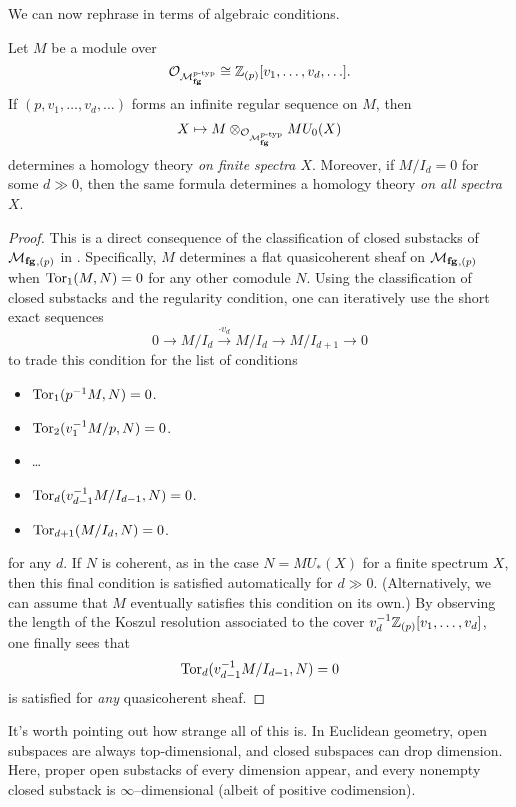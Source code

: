We can now rephrase  in terms of algebraic conditions.
\begin{theorem}
Let $M$ be a module over \[\mathcal{O}_{\mathcal{M}_{\mathbf{fg}}^{p\text{-}\mathrm{typ}}} \cong \mathbb Z_{(p)}[v_1, \ldots, v_d, \ldots].\]  If $(p, v_1, \ldots, v_d, \ldots)$ forms an infinite regular sequence on $M$, then \[X \mapsto M \otimes_{\mathcal{O}_{\mathcal{M}_{\mathbf{fg}}^{p\text{-}\mathrm{typ}}}} MU_0(X)\] determines a homology theory \emph{on finite spectra $X$}.  Moreover, if $M/I_d = 0$ for some $d \gg 0$, then the same formula determines a homology theory \emph{on all spectra $X$}.
\end{theorem}
\begin{proof}
This is a direct consequence of the classification of closed substacks of $\mathcal{M}_{\mathbf{fg}}{}_{,(p)}$ in .  Specifically, $M$ determines a flat quasicoherent sheaf on $\mathcal{M}_{\mathbf{fg}}{}_{,(p)}$ when $\operatorname{Tor}_1(M, N) = 0$ for any other comodule $N$.  Using the classification of closed substacks and the regularity condition, one can iteratively use the short exact sequences \[0 \to M / I_d \xrightarrow{\cdot v_d} M / I_d \to M / I_{d+1} \to 0\] to trade this condition for the list of conditions
\begin{itemize}
\item $\operatorname{Tor}_1(p^{-1} M, N) = 0$.
\item $\operatorname{Tor}_2(v_1^{-1} M / p, N) = 0$.
\item \ldots
\item $\operatorname{Tor}_d(v_{d-1}^{-1} M / I_{d-1}, N) = 0$.
\item $\operatorname{Tor}_{d+1}(M / I_d, N) = 0$.
\end{itemize}
for any $d$.  If $N$ is coherent, as in the case $N = MU_*(X)$ for a finite spectrum $X$, then this final condition is satisfied automatically for $d \gg 0$.  (Alternatively, we can assume that $M$ eventually satisfies this condition on its own.)  By observing the length of the Koszul resolution associated to the cover $v_d^{-1} \mathbb Z_{(p)}[v_1, \ldots, v_d]$, one finally sees that \[\operatorname{Tor}_d(v_{d-1}^{-1} M / I_{d-1}, N) = 0\] is satisfied for \emph{any} quasicoherent sheaf.
\end{proof}

\begin{remark}
It's worth pointing out how strange all of this is. In Euclidean geometry, open subspaces are always top-dimensional, and closed subspaces can drop dimension.  Here, proper open substacks of every dimension appear, and every nonempty closed substack is $\infty$--dimensional (albeit of positive codimension).
\end{remark}








